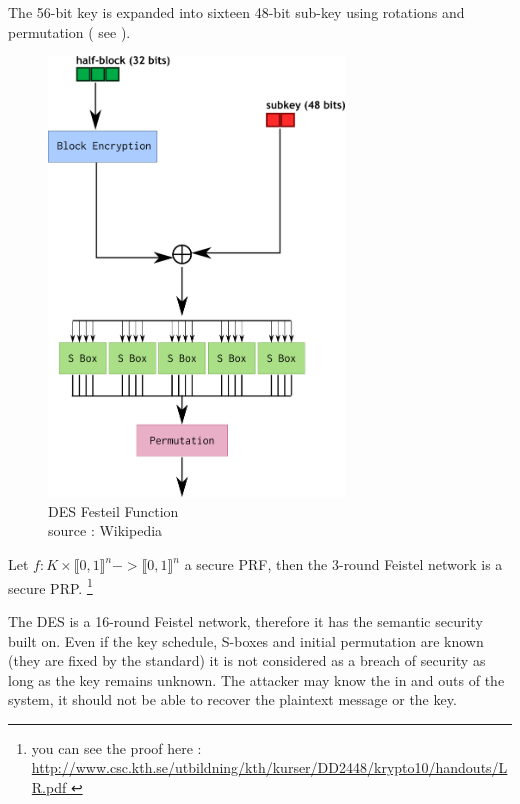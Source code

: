 The 56-bit key is expanded into sixteen 48-bit sub-key using rotations and permutation ( see \cite{DES-wikipedia} ).

\begin{figure}[ht!]
    \centering
       \includegraphics[width=0.7\textwidth]{images/DES-f-function.png}
    \caption{DES Festeil Function \\ source : Wikipedia}
	\label{fig:DES-f-function}
\end{figure}


\begin{mytheorem}
    Let $f:K\times\llbracket0,1\rrbracket^n -> \llbracket0,1\rrbracket^n$ a secure PRF, then the 3-round Feistel network is a secure PRP. \footnote{ you can see the proof here : \url{http://www.csc.kth.se/utbildning/kth/kurser/DD2448/krypto10/handouts/LR.pdf }}
\end{mytheorem}

The DES is a 16-round Feistel network, therefore it has the semantic security built on.  Even if the key schedule, S-boxes and initial permutation are known (they are fixed by the standard) it is not considered as a breach of security as long as the key remains unknown. The attacker may know the in and outs of the system, it should not be able to recover the plaintext message or the key.

